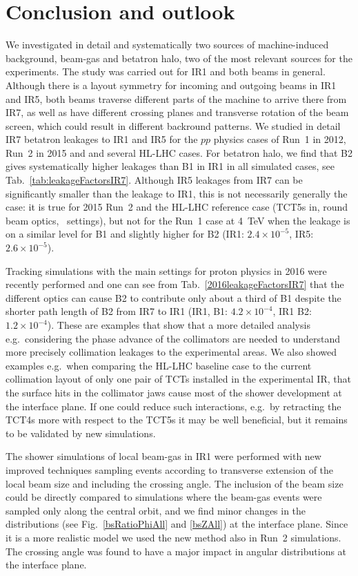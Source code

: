 \section{Conclusion and outlook~\label{last}}

We investigated in detail and systematically two sources of machine-induced background, beam-gas and betatron halo, two of the most relevant sources for the experiments. The study was carried out for IR1 and both beams in general. Although there is a layout symmetry for incoming and outgoing beams in IR1 and IR5, both beams traverse different parts of the machine to arrive there from IR7, as well as have different crossing planes and transverse rotation of the beam screen, which could result in different backround patterns. We studied in detail IR7 betatron leakages to IR1 and IR5 for the $pp$ physics cases of Run~1 in 2012, Run~2 in 2015 and and several HL-LHC cases. For betatron halo, we find that B2 gives systematically higher leakages than B1 in IR1 in all simulated cases, see Tab.~\ref{tab:leakageFactorsIR7}. Although IR5 leakages from IR7 can be significantly smaller than the leakage to IR1, this is not necessarily generally the case: it is true for 2015 Run~2 and the HL-LHC reference case (TCT5s in, round beam optics, \twosigmaret~settings), but not for the Run~1 case at 4~TeV when the leakage is on a similar level for B1 and slightly higher for B2 (IR1: $2.4 \times 10^{-5}$, IR5: $2.6 \times 10^{-5}$).

Tracking simulations with the main settings for proton physics in 2016 were recently performed and one can see from Tab.~\ref{2016leakageFactorsIR7} that the different optics can cause B2 to contribute only about a third of B1 despite the shorter path length of B2 from IR7 to IR1 (IR1, B1: $4.2 \times 10^{-4}$, IR1 B2:$1.2 \times 10^{-4}$). These are examples that show that a more detailed analysis e.g.~considering the phase advance of the collimators are needed to understand more precisely collimation leakages to the experimental areas. We also showed examples e.g.~when comparing the HL-LHC baseline case to the current collimation layout of only one pair of TCTs installed in the experimental IR, that the surface hits in the collimator jaws cause most of the shower development at the interface plane. If one could reduce such interactions, e.g.~by retracting the TCT4s more with respect to the TCT5s it may be well beneficial, but it remains to be validated by new simulations.

The shower simulations of local beam-gas in IR1 were performed with new improved techniques sampling events according to transverse extension of the local beam size and including the crossing angle. The inclusion of the beam size could be directly compared to simulations where the beam-gas events were sampled only along the central orbit, and we find minor changes in the distributions (see Fig.~\ref{bsRatioPhiAll} and \ref{bsZAll}) at the interface plane. Since it is a more realistic model we used the new method also in Run~2 simulations. The crossing angle was found to have a major impact in angular distributions at the interface plane.

